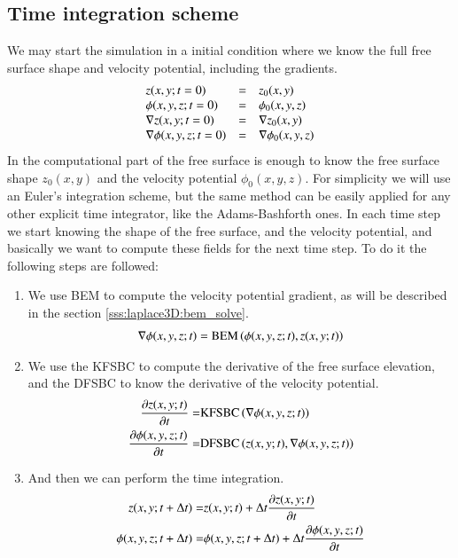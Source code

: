\subsection{Time integration scheme}
\label{sss:laplace3D:TimeIntegration}
%
We may start the simulation in a initial condition where we know the
full free surface shape and velocity potential, including the gradients.
%
\begin{eqnarray}
	\label{eq:laplace3D:IC}
	\begin{array}{lcl}
		z(x,y;t=0) & = & z_0(x,y)
		\\
		\phi(x,y,z;t=0) & = & \phi_0(x,y,z)
		\\
		\gradient z(x,y;t=0) & = & \gradient z_0(x,y)
		\\
		\gradient \phi(x,y,z;t=0) & = & \gradient \phi_0(x,y,z)
	\end{array}
\end{eqnarray}
%
In the computational part of the free surface is enough to know the free
surface shape $z_0(x,y)$ and the velocity potential $\phi_0(x,y,z)$.\rc
%
For simplicity we will use an Euler's integration scheme, but the same
method can be easily applied for any other explicit time integrator, like
the Adams-Bashforth ones.\rc
%
In each time step we start knowing the shape of the free surface, and the
velocity potential, and basically we want to compute these fields for the
next time step. To do it the following steps are followed:
%
\begin{enumerate}
	\item We use BEM to compute the velocity potential gradient, as will be
	described in the section \ref{sss:laplace3D:bem_solve}.
	\begin{eqnarray}
		\label{eq:laplace3D:time_march:bem}
		\gradient{\phi(x,y,z;t)} = \mbox{BEM}\left(\phi(x,y,z;t), z(x,y;t)\right)
	\end{eqnarray}
	\item We use the KFSBC to compute the derivative of the free surface
	elevation, and the DFSBC to know the derivative of the velocity potential.
	\begin{eqnarray}
		\label{eq:laplace3D:time_march:dzdt}
		\frac{\partial z(x,y;t)}{\partial t} = &
			\mbox{KFSBC}\left(\gradient{\phi(x,y,z;t)}\right)
		\\
		\label{eq:laplace3D:time_march:dphidt}
		\frac{\partial \phi(x,y,z;t)}{\partial t} = &
			\mbox{DFSBC}\left(z(x,y;t), \gradient{\phi(x,y,z;t)}\right)
	\end{eqnarray}
	\item And then we can perform the time integration.
	\begin{eqnarray}
		\label{eq:laplace3D:time_march:z_integrate}
		z(x,y;t + \Delta t) = &
			z(x,y;t) +
			\Delta t \dsty \frac{\partial z(x,y;t)}{\partial t}
		\\
		\label{eq:laplace3D:time_march:phi_integrate}
		\phi(x,y,z;t + \Delta t) = &
			\phi(x,y,z;t + \Delta t) +
			\Delta t \dsty \frac{\partial \phi(x,y,z;t)}{\partial t}
	\end{eqnarray}
\end{enumerate}
%
